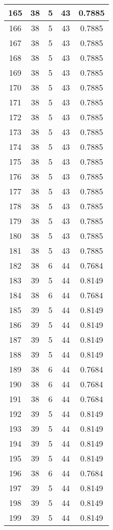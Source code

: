 \documentclass[letterpaper, 12pt]{article}
\begin{document}
\begin{longtable}{|c|c|c|c|c|}
\hline
165 & 38 & 5 & 43 & 0.7885 \\
\hline
166 & 38 & 5 & 43 & 0.7885 \\
\hline
167 & 38 & 5 & 43 & 0.7885 \\
\hline
168 & 38 & 5 & 43 & 0.7885 \\
\hline
169 & 38 & 5 & 43 & 0.7885 \\
\hline
170 & 38 & 5 & 43 & 0.7885 \\
\hline
171 & 38 & 5 & 43 & 0.7885 \\
\hline
172 & 38 & 5 & 43 & 0.7885 \\
\hline
173 & 38 & 5 & 43 & 0.7885 \\
\hline
174 & 38 & 5 & 43 & 0.7885 \\
\hline
175 & 38 & 5 & 43 & 0.7885 \\
\hline
176 & 38 & 5 & 43 & 0.7885 \\
\hline
177 & 38 & 5 & 43 & 0.7885 \\
\hline
178 & 38 & 5 & 43 & 0.7885 \\
\hline
179 & 38 & 5 & 43 & 0.7885 \\
\hline
180 & 38 & 5 & 43 & 0.7885 \\
\hline
181 & 38 & 5 & 43 & 0.7885 \\
\hline
182 & 38 & 6 & 44 & 0.7684 \\
\hline
183 & 39 & 5 & 44 & 0.8149 \\
\hline
184 & 38 & 6 & 44 & 0.7684 \\
\hline
185 & 39 & 5 & 44 & 0.8149 \\
\hline
186 & 39 & 5 & 44 & 0.8149 \\
\hline
187 & 39 & 5 & 44 & 0.8149 \\
\hline
188 & 39 & 5 & 44 & 0.8149 \\
\hline
189 & 38 & 6 & 44 & 0.7684 \\
\hline
190 & 38 & 6 & 44 & 0.7684 \\
\hline
191 & 38 & 6 & 44 & 0.7684 \\
\hline
192 & 39 & 5 & 44 & 0.8149 \\
\hline
193 & 39 & 5 & 44 & 0.8149 \\
\hline
194 & 39 & 5 & 44 & 0.8149 \\
\hline
195 & 39 & 5 & 44 & 0.8149 \\
\hline
196 & 38 & 6 & 44 & 0.7684 \\
\hline
197 & 39 & 5 & 44 & 0.8149 \\
\hline
198 & 39 & 5 & 44 & 0.8149 \\
\hline
199 & 39 & 5 & 44 & 0.8149 \\
\hline
\end{longtable}
\end{document}
